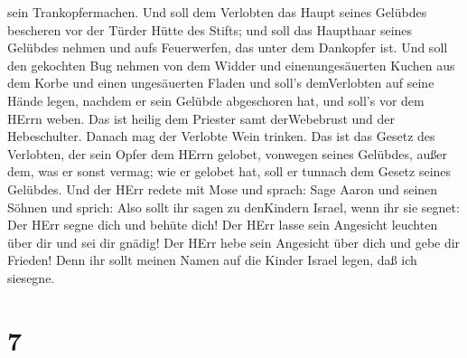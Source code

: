 sein Trankopfermachen.  Und soll dem Verlobten das Haupt
seines Gelübdes bescheren vor der Türder Hütte des Stifts; und soll das
Haupthaar seines Gelübdes nehmen und aufs Feuerwerfen, das unter dem
Dankopfer ist.  Und soll den gekochten Bug nehmen von dem
Widder und einenungesäuerten Kuchen aus dem Korbe und einen ungesäuerten
Fladen und soll's demVerlobten auf seine Hände legen, nachdem er sein
Gelübde abgeschoren hat,  und soll's vor dem HErrn weben.
Das ist heilig dem Priester samt derWebebrust und der Hebeschulter.
Danach mag der Verlobte Wein trinken.  Das ist das Gesetz
des Verlobten, der sein Opfer dem HErrn gelobet, vonwegen seines
Gelübdes, außer dem, was er sonst vermag; wie er gelobet hat, soll er
tunnach dem Gesetz seines Gelübdes.  Und der HErr redete
mit Mose und sprach:  Sage Aaron und seinen Söhnen und
sprich: Also sollt ihr sagen zu denKindern Israel, wenn ihr sie segnet:
 Der HErr segne dich und behüte dich!  Der
HErr lasse sein Angesicht leuchten über dir und sei dir gnädig!
 Der HErr hebe sein Angesicht über dich und gebe dir
Frieden!  Denn ihr sollt meinen Namen auf die Kinder Israel
legen, daß ich siesegne.

\hypertarget{section-6}{%
\section{7}\label{section-6}}

